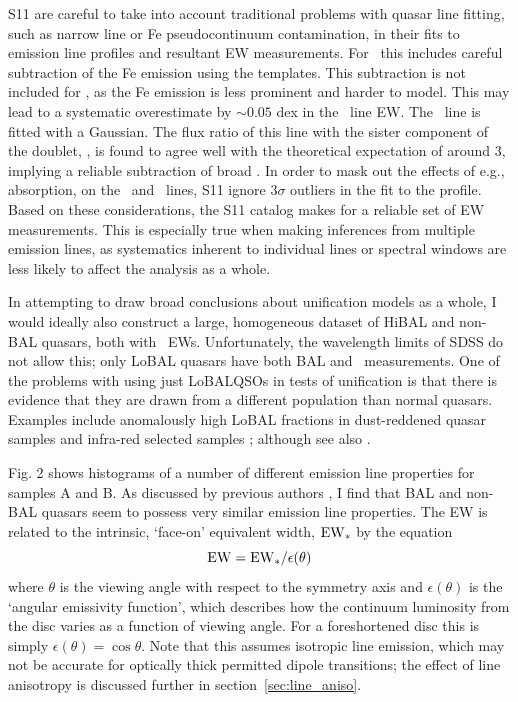 S11 are careful to take into account traditional problems with quasar line fitting,
such as narrow line or Fe pseudocontinuum contamination, in their fits to 
emission line profiles and resultant EW measurements. For \mgline\
this includes careful subtraction of the Fe emission using the \cite{vestergaard2001}
templates. This subtraction is not included for \civfull,
as the Fe emission is less prominent and harder to model. This may lead to
a systematic overestimate by $\sim0.05$ dex in the \civ\ line EW. 
The \oiiifull\ line is fitted with a Gaussian. The flux ratio of this line 
with the sister component of the doublet, \oiiidoublet, is found to agree well 
with the theoretical expectation of around 3, implying a reliable subtraction of broad \hb.
In order to mask out the effects of e.g., absorption, on the \civ\ and \mg\ lines, 
S11 ignore $3\sigma$ outliers in the fit to the profile. Based on these
considerations, the S11 catalog makes for a reliable set of EW 
measurements. This is especially true when making inferences from 
multiple emission lines, as systematics inherent to individual lines 
or spectral windows are less likely to affect the analysis as a whole.
\index{emission line}\index{quasar}\index{SDSS}

In attempting to draw broad conclusions about unification models as a whole,
I would ideally also construct a large, homogeneous dataset of 
HiBAL and non-BAL quasars, both with \oiiifull\ EWs. Unfortunately,
the wavelength limits of SDSS do not allow this; only LoBAL quasars have 
both BAL and \ewo\ measurements. One of the problems with
using just LoBALQSOs in tests of unification is that there is evidence 
that they are drawn from a different population than normal quasars. 
Examples include anomalously 
high LoBAL fractions in dust-reddened quasar samples \citep{urrutia2009} 
and infra-red selected samples \citep{dai2012}; 
although see also \cite{lazarova2012}.

Fig. 2 shows histograms of a number of different 
emission line properties for samples A and B. 
As discussed by previous authors \cite[e.g.][]{weymann1991}, I find that BAL
and non-BAL quasars seem to possess very similar emission line 
properties. The EW is related to the intrinsic, `face-on' equivalent width,
${\rm EW}_*$ by the equation
\begin{equation}
{\rm EW} = {\rm EW}_* /\epsilon(\theta)
\end{equation}
where $\theta$ is the viewing angle with respect to the symmetry axis 
and $\epsilon(\theta)$ is the `angular emissivity function', which describes 
how the continuum luminosity from the disc varies as a function of viewing angle.
For a foreshortened disc this is simply $\epsilon(\theta) = \cos \theta$. 
Note that this assumes isotropic line emission, which may not be accurate for optically thick
permitted dipole transitions; the effect of line anisotropy is discussed further 
in section~\ref{sec:line_aniso}. 

